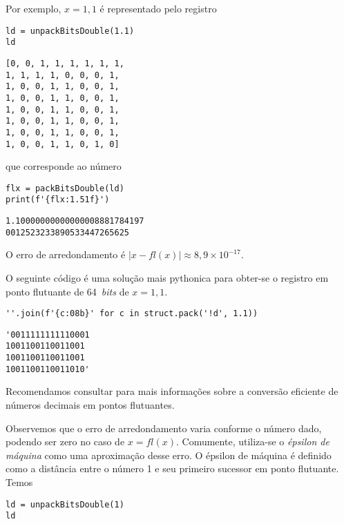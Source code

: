 Por exemplo, $x = 1,1$ é representado pelo registro

\begin{lstlisting}
ld = unpackBitsDouble(1.1)
ld
\end{lstlisting}

\begin{verbatim}
[0, 0, 1, 1, 1, 1, 1, 1,
1, 1, 1, 1, 0, 0, 0, 1,
1, 0, 0, 1, 1, 0, 0, 1,
1, 0, 0, 1, 1, 0, 0, 1,
1, 0, 0, 1, 1, 0, 0, 1,
1, 0, 0, 1, 1, 0, 0, 1,
1, 0, 0, 1, 1, 0, 0, 1,
1, 0, 0, 1, 1, 0, 1, 0]
\end{verbatim}

que corresponde ao número

\begin{lstlisting}
flx = packBitsDouble(ld)
print(f'{flx:1.51f}')
\end{lstlisting}

\begin{verbatim}
1.10000000000000008881784197
0012523233890533447265625  
\end{verbatim}

O erro de arredondamento é $|x - fl(x)| \approx 8,9\times 10^{-17}$.

\begin{obs}\label{obs:unpackBitsDouble}
  O seguinte código é uma solução mais pythonica para obter-se o registro em ponto flutuante de 64~{\it bits} de $x = 1,1$.

\begin{lstlisting}
''.join(f'{c:08b}' for c in struct.pack('!d', 1.1))
\end{lstlisting}

\begin{verbatim}
'0011111111110001
1001100110011001
1001100110011001
1001100110011010'  
\end{verbatim}

  Recomendamos consultar \cite{Lemire2021a} para mais informações sobre a conversão eficiente de números decimais em pontos flutuantes.
\end{obs}

Observemos que o erro de arredondamento varia conforme o número dado, podendo ser zero no caso de $x = fl(x)$. Comumente, utiliza-se o \emph{épsilon de máquina} como uma aproximação desse erro. O épsilon de máquina é definido como a distância entre o número 1 e seu primeiro sucessor em ponto flutuante. Temos

\begin{lstlisting}
ld = unpackBitsDouble(1)
ld
\end{lstlisting}

